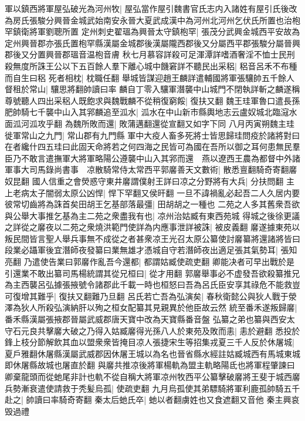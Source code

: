 軍以鎮西將軍屋弘破光為河州牧|{
	屋弘當作屋引魏書官氏志内入諸姓有屋引氏後改為房氏張駿分興晉金城武始南安永晉大夏武成漢中為河州北河州乞伏氏所置也治枹罕鎮衛將軍劉聰所置}
定州刺史翟瑥為興晉太守鎮枹罕|{
	張茂分武興金城西平安故為定州興晉郡亦張氏置枹罕縣漢屬金城郡後漢屬隴西郡後又分屬西平郡張駿分屬晉興郡後又分置興晉郡瑥音温枹音膚}
秋七月慕容詳殺可足渾潭詳嗜酒奢淫不恤士民刑殺無度所誅王公以下五百餘人羣下離心城中饑窘詳不聽民出采稆|{
	稆音呂禾不布種而自生曰稆}
死者相枕|{
	枕職任翻}
舉城皆謀迎趙王麟詳遣輔國將軍張驤帥五千餘人督租於常山|{
	驤思將翻帥讀曰率}
麟自丁零入驤軍潛襲中山城門不閉執詳斬之麟遂稱尊號聽人四出采稆人既飽求與魏戰麟不從稍復窮餒|{
	復扶又翻}
魏王珪軍魯口遣長孫肥帥騎七千襲中山入其郛麟追至泒水|{
	泒水在中山新市縣輿地志云盧奴城北臨滱水面泒河泒攻乎翻}
為魏所敗而還|{
	敗蒲邁翻還從宣翻又如字下同}
八月丙寅朔魏主珪徙軍常山之九門|{
	常山郡有九門縣}
軍中大疫人畜多死將士皆思歸珪問疫於諸將對曰在者纔什四五珪曰此固天命將若之何四海之民皆可為國在吾所以御之耳何患無民羣臣乃不敢言遣撫軍大將軍略陽公遵襲中山入其郛而還　燕以遼西王農為都督中外諸軍事大司馬錄尚書事　凉散騎常侍太常西平郭黁善天文數術|{
	散悉亶翻騎奇寄翻黁奴昆翻}
國人信重之會熒惑守東井黁謂僕射王詳曰凉之分野將有大兵|{
	分扶問翻}
主上老病太子闇弱太原公凶悍|{
	悍下罕翻又侯旰翻}
一旦不諱禍亂必起吾二人久居内要彼常切齒將為誅首矣田胡王乞基部落最彊|{
	田胡胡之一種也}
二苑之人多其舊衆吾欲與公舉大事推乞基為主二苑之衆盡我有也|{
	凉州治姑臧有東西苑城}
得城之後徐更議之詳從之黁夜以二苑之衆燒洪範門使詳為内應事泄詳被誅|{
	被皮義翻}
黁遂據東苑以叛民間皆言聖人舉兵事無不成從之者甚衆凉王光召太原公纂使討黁纂將還諸將皆曰段業必躡軍後宜潛師夜發纂曰業無雄才憑城自守若潛師夜出適足張其氣勢耳|{
	張知亮翻}
乃遣使告業曰郭黁作亂吾今還都|{
	都謂姑臧使疏吏翻}
卿能决者可早出戰於是引還業不敢出纂司馬楊統謂其從兄桓曰|{
	從才用翻}
郭黁舉事必不虚發吾欲殺纂推兄為主西襲呂弘據張掖號令諸郡此千載一時也桓怒曰吾為呂氏臣安享其祿危不能救豈可復增其難乎|{
	復扶又翻難乃旦翻}
呂氏若亡吾為弘演矣|{
	春秋衛懿公與狄人戰于滎澤為狄人所殺弘演納肝以殉之桓女配纂其見親異於他臣故云然}
統至番禾遂叛歸黁|{
	番禾縣漢屬張掖郡晉屬武威郡唐天寶中改為天寶縣番音盤}
弘纂之弟也纂與西安太守石元良共擊黁大破之乃得入姑臧黁得光孫八人於東苑及敗而恚|{
	恚於避翻}
悉投於鋒上枝分節解飲其血以盟衆衆皆掩目凉人張捷宋生等招集戎夏三千人反於休屠城|{
	夏戶雅翻休屠縣漢屬武威郡因休屠王城以為名也晉省縣水經註姑臧城西有馬城東城即休屠縣故城也屠直於翻}
與黁共推凉後將軍楊軌為盟主軌略陽氐也將軍程肇諫曰卿棄龍頭而從虵尾非計也軌不從自稱大將軍凉州牧西平公纂擊破黁將王斐于城西黁兵勢漸衰遣使請救于秃髪烏孤|{
	使疏吏翻}
九月烏孤使其弟驃騎將軍利鹿孤帥騎五千赴之|{
	帥讀曰率騎奇寄翻}
秦太后虵氏卒|{
	虵以者翻虜姓也又食遮翻又音他}
秦主興哀毁過禮

